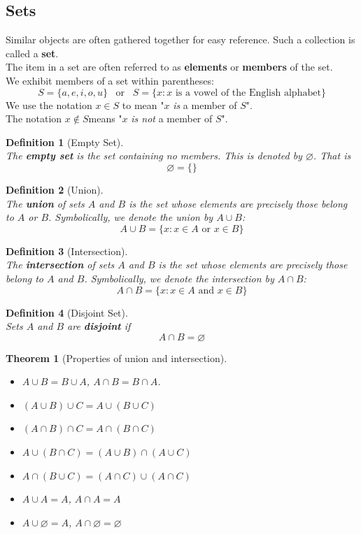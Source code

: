 \documentclass[12pt]{article}
\newtheorem{definition}{Definition}[section]
\newtheorem{theorem}{Theorem}[section]
\theoremstyle{definition}
\begin{document}
\subsection{Sets}
Similar objects are often gathered together for easy reference. Such a collection is called a \textbf{set}.\\
The item in a set are often referred to as \textbf{elements} or \textbf{members} of the set.\\
We exhibit members of a set within parentheses:
\[
S = \{a,e,i,o,u\}\;\;\;\text{or}\;\;\;S=\{x:x \text{ is a vowel of the English alphabet}\}
\]
We use the notation $x\in S$ to mean "$x$\textit{ is }a member of $S$". \\The notation $x\not\in S$means "$x$ \textit{ is not }a member of $S$".
\begin{definition}[Empty Set]
\hfill\\\normalfont The \textbf{empty set} is the set containing \textit{no} members. This is denoted by $\varnothing$. That is
\[
\varnothing = \{\}
\]
\end{definition}
\begin{definition}[Union]
\hfill\\\normalfont The \textbf{union} of sets $A$ and $B$ is the set whose elements are precisely those belong to $A$ or $B$. Symbolically, we denote the union by $A\cup B$:
\[
A\cup B = \{x:x\in A \text{ or } x\in B\}
\]
\end{definition}
\begin{definition}[Intersection]
\hfill\\\normalfont The \textbf{intersection} of sets $A$ and $B$ is the set whose elements are precisely those belong to $A$ and $B$. Symbolically, we denote the intersection by $A\cap B$:
\[
A\cap B = \{x:x\in A \text{ and } x\in B\}
\]
\end{definition}
\begin{definition}[Disjoint Set]
\hfill\\\normalfont Sets $A$ and $B$ are \textbf{disjoint} if
\[
A\cap B = \varnothing
\]
\end{definition}
\begin{theorem}[Properties of union and intersection]
\hfill\\\normalfont
\begin{itemize}
  \item $A\cup B = B\cup A$, $A\cap B = B\cap A$.
  \item $(A\cup B)\cup C = A\cup(B\cup C)$
  \item $(A\cap B)\cap C = A\cap (B\cap C)$
  \item $A\cup(B\cap C) = (A\cup B)\cap (A\cup C)$
  \item $A\cap(B\cup C) = (A\cap C)\cup (A\cap C)$
  \item $A\cup A = A$, $A\cap A = A$
  \item $A\cup \varnothing = A$, $A\cap \varnothing = \varnothing$
\end{itemize}
\end{theorem}
\end{document}
